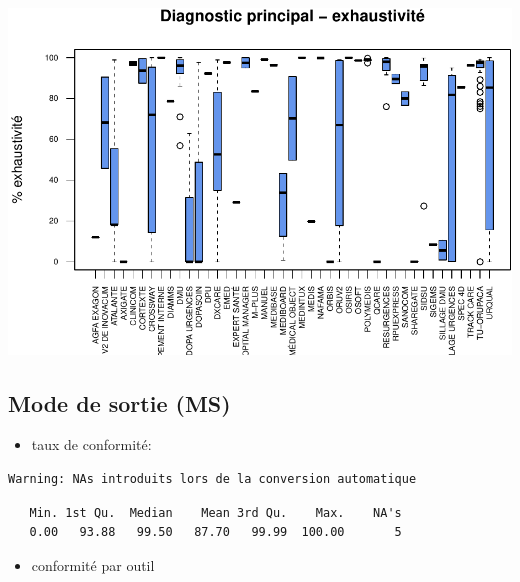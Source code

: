 \documentclass[]{article}
\providecommand{\tightlist}{%
  \setlength{\itemsep}{0pt}\setlength{\parskip}{0pt}}
\begin{document}
\includegraphics{septembre2015_files/figure-latex/unnamed-chunk-20-1.pdf}

\subsection{Mode de sortie (MS)}\label{mode-de-sortie-ms}

\begin{itemize}
\tightlist
\item
  taux de conformité:
\end{itemize}

\begin{verbatim}
Warning: NAs introduits lors de la conversion automatique
\end{verbatim}

\begin{verbatim}
   Min. 1st Qu.  Median    Mean 3rd Qu.    Max.    NA's 
   0.00   93.88   99.50   87.70   99.99  100.00       5 
\end{verbatim}

\begin{itemize}
\tightlist
\item
  conformité par outil
\end{itemize}
\end{document}
